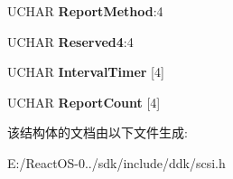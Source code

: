 \begin{DoxyCompactItemize}
\begin{tabbing}
\end{tabbing}\item 
\mbox{\label{struct___m_o_d_e___i_n_f_o___e_x_c_e_p_t_i_o_n_s_a60c1ad0473a46f828099475b4c6959cc}} 
U\+C\+H\+AR {\bfseries Report\+Method}\+:4
\item 
\mbox{\label{struct___m_o_d_e___i_n_f_o___e_x_c_e_p_t_i_o_n_s_a1f90f231629e5318d7dd0f59c16c8ba6}} 
U\+C\+H\+AR {\bfseries Reserved4}\+:4
\item 
\mbox{\label{struct___m_o_d_e___i_n_f_o___e_x_c_e_p_t_i_o_n_s_ac7406966621061f31a4dff78f2a5d95d}} 
U\+C\+H\+AR {\bfseries Interval\+Timer} \mbox{[}4\mbox{]}
\item 
\mbox{\label{struct___m_o_d_e___i_n_f_o___e_x_c_e_p_t_i_o_n_s_a08f40fa54a517174fa939dbd89fbb9a9}} 
U\+C\+H\+AR {\bfseries Report\+Count} \mbox{[}4\mbox{]}
\end{DoxyCompactItemize}


该结构体的文档由以下文件生成\+:\begin{DoxyCompactItemize}
\item 
E\+:/\+React\+O\+S-\/0../sdk/include/ddk/scsi.\+h\end{DoxyCompactItemize}

